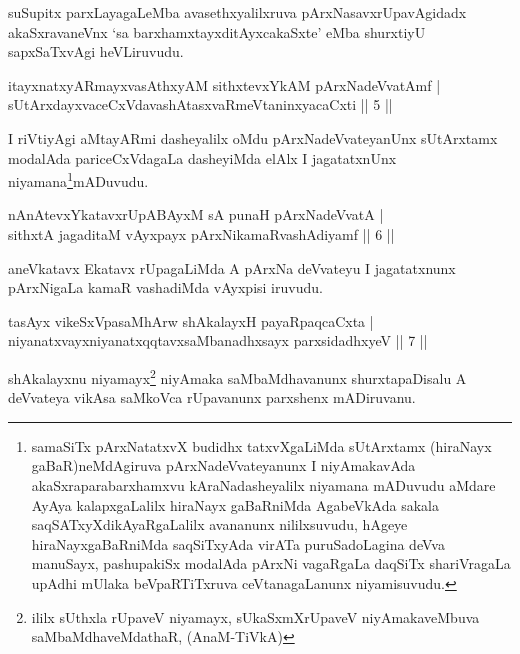 \begin{artha}
suSupitx parxLayagaLeMba avasethxyalilxruva pArxNasavxrUpavAgidadx akaSxravaneVnx `sa barxhamxtayxditAyxcakaSxte' eMba shurxtiyU sapxSaTxvAgi heVLiruvudu.
\end{artha}%

\begin{shl}
itayxnatxyARmayxvasAthxyAM sithxtevxYkAM pArxNadeVvatAmf |\\
sUtArxdayxvaceCxVdavashAtasxvaRmeVtaninxyacaCxti \hfill || 5 ||
\end{shl}

\begin{artha}
I riVtiyAgi aMtayARmi dasheyalilx oMdu pArxNadeVvateyanUnx sUtArxtamx modalAda pariceCxVdagaLa dasheyiMda elAlx I jagatatxnUnx niyamana\footnote[1]{samaSiTx pArxNatatxvX budidhx tatxvXgaLiMda sUtArxtamx (hiraNayx gaBaR)neMdAgiruva pArxNadeVvateyanunx I niyAmakavAda akaSxraparabarxhamxvu kAraNadasheyalilx niyamana mADuvudu aMdare AyAya kalapxgaLalilx hiraNayx gaBaRniMda AgabeVkAda sakala saqSATxyXdikAyaRgaLalilx avananunx nililxsuvudu, hAgeye hiraNayxgaBaRniMda saqSiTxyAda virATa puruSadoLagina deVva manuSayx, pashupakiSx modalAda pArxNi vagaRgaLa daqSiTx shariVragaLa upAdhi mUlaka beVpaRTiTxruva ceVtanagaLanunx niyamisuvudu.}mADuvudu.
\end{artha}

\begin{shl}
nAnAtevxYkatavxrUpABAyxM sA punaH pArxNadeVvatA |\\
sithxtA jagaditaM vAyxpayx pArxNikamaRvashAdiyamf \hfill || 6 ||
\end{shl}

\begin{artha}
aneVkatavx Ekatavx rUpagaLiMda A pArxNa deVvateyu I jagatatxnunx pArxNigaLa kamaR vashadiMda vAyxpisi iruvudu.
\end{artha}

\begin{shl}
tasAyx vikeSxVpasaMhArw shAkalayxH payaRpaqcaCxta |\\
niyanatxvayxniyanatxqqtavxsaMbanadhxsayx parxsidadhxyeV \hfill || 7 ||
\end{shl}

\begin{artha}
shAkalayxnu niyamayx\footnote[2]{ililx sUthxla rUpaveV niyamayx, sUkaSxmXrUpaveV niyAmakaveMbuva saMbaMdhaveMdathaR, (AnaM-TiVkA)} niyAmaka saMbaMdhavanunx shurxtapaDisalu A deVvateya vikAsa saMkoVca rUpavanunx parxshenx mADiruvanu.
\end{artha}

